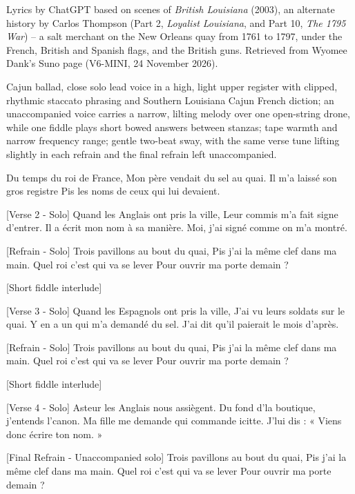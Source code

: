 \begin{notes}
Lyrics by ChatGPT based on scenes of \emph{British Louisiana} (2003), an alternate history by Carlos Thompson (Part 2, \emph{Loyalist Louisiana}, and Part 10, \emph{The 1795 War}) -- a salt merchant on the New Orleans quay from 1761 to 1797, under the French, British and Spanish flags, and the British guns. Retrieved from Wyomee Dank's Suno page (V6-MINI, 24 November 2026).
\end{notes}
\begin{style}
Cajun ballad, close solo lead voice in a high, light upper register with clipped, rhythmic staccato phrasing and Southern Louisiana Cajun French diction; an unaccompanied voice carries a narrow, lilting melody over one open-string drone, while one fiddle plays short bowed answers between stanzas; tape warmth and narrow frequency range; gentle two-beat sway, with the same verse tune lifting slightly in each refrain and the final refrain left unaccompanied.
\end{style}
\begin{lyrics}
Du temps du roi de France,
Mon père vendait du sel au quai.
Il m’a laissé son gros registre
Pis les noms de ceux qui lui devaient.

[Verse 2 - Solo]
Quand les Anglais ont pris la ville,
Leur commis m’a fait signe d’entrer.
Il a écrit mon nom à sa manière.
Moi, j’ai signé comme on m’a montré.

[Refrain - Solo]
Trois pavillons au bout du quai,
Pis j’ai la même clef dans ma main.
Quel roi c’est qui va se lever
Pour ouvrir ma porte demain ?

[Short fiddle interlude]

[Verse 3 - Solo]
Quand les Espagnols ont pris la ville,
J’ai vu leurs soldats sur le quai.
Y en a un qui m’a demandé du sel.
J’ai dit qu’il paierait le mois d’après.

[Refrain - Solo]
Trois pavillons au bout du quai,
Pis j’ai la même clef dans ma main.
Quel roi c’est qui va se lever
Pour ouvrir ma porte demain ?

[Short fiddle interlude]

[Verse 4 - Solo]
Asteur les Anglais nous assiègent.
Du fond d’la boutique, j’entends l’canon.
Ma fille me demande qui commande icitte.
J’lui dis : « Viens donc écrire ton nom. »

[Final Refrain - Unaccompanied solo]
Trois pavillons au bout du quai,
Pis j’ai la même clef dans ma main.
Quel roi c’est qui va se lever
Pour ouvrir ma porte demain ?
\end{lyrics}

